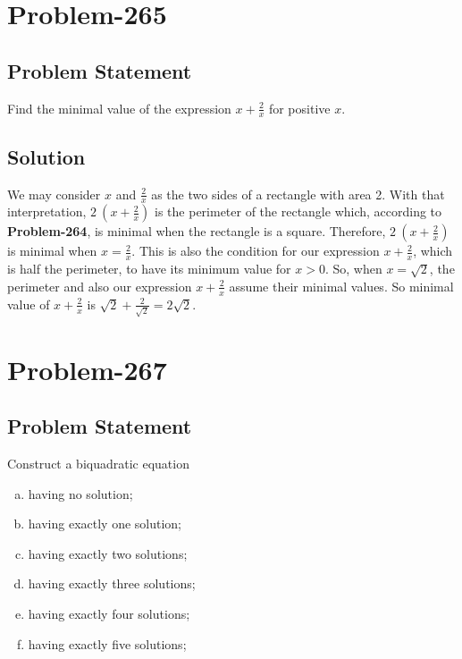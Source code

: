 \documentclass[12pt]{article}
\begin{document}
\section*{Problem-265}
\subsection*{Problem Statement}
Find the minimal value of the expression $x + \frac{2}{x}$ for positive $x$.

\subsection*{Solution}
We may consider $x$ and $\frac{2}{x}$ as the two sides of a rectangle with area 2. With that interpretation, $2\ \left( x + \frac{2}{x} \right)$ is the perimeter of the rectangle which, according to \textbf{Problem-264}, is minimal when the rectangle is a square. Therefore, $2\ \left( x + \frac{2}{x} \right)$ is minimal when $x = \frac{2}{x}$. This is also the condition for our expression $x + \frac{2}{x}$, which is half the perimeter, to have its minimum value for $x > 0$. So, when $x = \sqrt{2}$, the perimeter and also our expression $x + \frac{2}{x}$ assume their minimal values. So minimal value of $x + \frac{2}{x}$ is $\sqrt{2} + \frac{2}{\sqrt{2}} = 2\sqrt{2}$.

\section*{Problem-267}
\subsection*{Problem Statement}
Construct a biquadratic equation
\begin{enumerate}[(a)]
	\item having no solution;
	\item having exactly one solution;
	\item having exactly two solutions;
	\item having exactly three solutions;
	\item having exactly four solutions;
	\item having exactly five solutions;
\end{enumerate}
\end{document}
